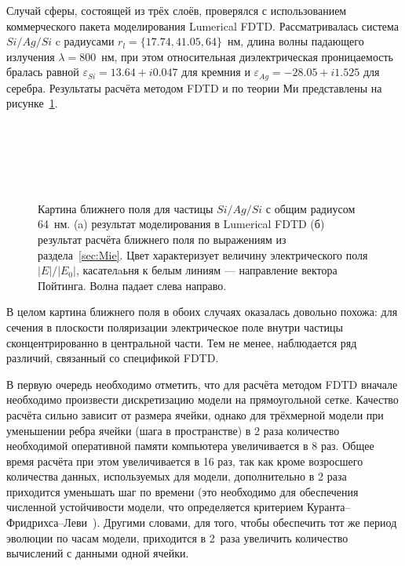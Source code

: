 Случай сферы, состоящей из трёх слоёв, проверялся с использованием
коммерческого пакета моделирования Lumerical FDTD. Рассматривалась
система $Si/Ag/Si$ c радиусами $r_l=\{17.74, 41.05, 64\}$~нм, длина
волны падающего излучения $\lambda = 800$~нм, при этом относительная
диэлектрическая проницаемость бралась равной
$\varepsilon_{Si} = 13.64 + i 0.047$ для кремния и
$\varepsilon_{Ag} = -28.05 + i 1.525$ для серебра.  Результаты расчёта
методом FDTD и по теории Ми представлены на рисунке~\ref{img:fdtd}.
\begin{figure}[p] %
  \begin{minipage}[ht]{0.99\linewidth}        
  \end{minipage}\\
  \vfill
  \begin{minipage}[ht]{0.99\linewidth}        
  \end{minipage}\\
  \vfill
  \begin{minipage}[ht]{0.99\linewidth}
  \end{minipage}\\
  \vfill
  \begin{minipage}[ht]{0.99\linewidth}
  \end{minipage}
  \caption{Картина ближнего поля для частицы $Si/Ag/Si$ с общим
    радиусом 64~нм. (a) результат моделирования в Lumerical FDTD (б)
    результат расчёта ближнего поля по выражениям из
    раздела~\ref{sec:Mie}. Цвет характеризует величину электрического
    поля $|E|/|E_0|$, касателaьня к белым линиям --- направление вектора
    Пойтинга. Волна падает слева направо.\label{img:fdtd}}
\end{figure}

В целом картина ближнего поля в обоих случаях оказалась довольно
похожа: для сечения в плоскости поляризации электрическое поле внутри
частицы сконцентрированно в центральной части. Тем не менее,
наблюдается ряд различий, связанный со спецификой FDTD.

В первую очередь необходимо отметить, что для расчёта методом FDTD
вначале необходимо произвести дискретизацию модели на прямоугольной
сетке. Качество расчёта сильно зависит от размера ячейки, однако для
трёхмерной модели при уменьшении ребра ячейки (шага в пространстве) в
2 раза количество необходимой оперативной памяти компьютера
увеличивается в 8 раз.  Общее время расчёта при этом увеличивается в
16 раз, так как кроме возросшего количества данных, используемых для
модели, дополнительно в 2 раза приходится уменьшать шаг по времени
(это необходимо для обеспечения численной устойчивости модели, что
определяется критерием
Куранта--Фридрихса--Леви~\cite{Courant-1941}). Другими словами, для
того, чтобы обеспечить тот же период эволюции по часам модели,
приходится в 2~раза увеличить количество вычислений с данными одной
ячейки.

